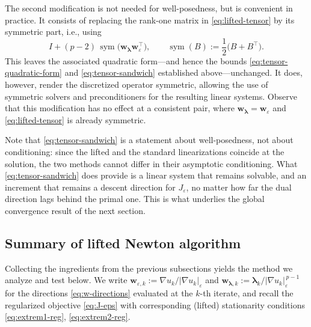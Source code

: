 \documentclass[11pt,pdflatex,sn-mathphys-num]{sn-jnl}
\theoremstyle{thmstyleone}%
\theoremstyle{thmstyletwo}%
\theoremstyle{thmstylethree}%
\newcommand{\bs}[1]{\ensuremath{\boldsymbol{#1}}}
\DeclareMathOperator{\sym}{sym}
\begin{document}
The second modification is not needed for well-posedness, but is convenient in practice. It consists of
replacing the rank-one matrix in \eqref{eq:lifted-tensor} by its symmetric part, i.e., using
\begin{equation}\label{eq:lifted-tensor-sym}
  I + (p-2)\,\sym\bigl(\bs w_{\bs\lambda}\bs w_\varepsilon^\top\bigr),
  \qquad \sym(B):=\frac12\bigl(B+B^\top\bigr).
\end{equation}
This leaves the associated quadratic form---and hence the bounds \eqref{eq:tensor-quadratic-form} and \eqref{eq:tensor-sandwich} established above---unchanged. It does, however, render the discretized operator symmetric, allowing the use of symmetric solvers and preconditioners for the resulting linear systems. Observe that this modification has no effect at a consistent pair, where $\bs w_{\bs\lambda}=\bs w_\varepsilon$ and \eqref{eq:lifted-tensor} is already symmetric.

Note that \eqref{eq:tensor-sandwich} is a statement about well-posedness, not about conditioning: since the lifted and the standard linearizations coincide at the solution, the two methods cannot differ in their asymptotic conditioning. What \eqref{eq:tensor-sandwich} does provide is a linear system that remains solvable, and an increment that remains a descent direction for $J_\varepsilon$, no matter how far the dual direction lags behind the primal one. This is what underlies the global convergence result of the next section.


\subsection{Summary of lifted Newton algorithm}
\label{ssec:lifted-algorithm}
Collecting the ingredients from the previous subsections yields the method we analyze and test below. We write
$\bs w_{\varepsilon,k}:=\nabla u_k/|\nabla u_k|_\varepsilon$ and
$\bs w_{\bs\lambda,k}:=\bs\lambda_k/|\nabla u_k|_\varepsilon^{\,p-1}$
for the directions \eqref{eq:w-directions} evaluated at the $k$-th iterate, and recall the regularized objective \eqref{eq:J-eps} with corresponding (lifted) stationarity conditions \eqref{eq:extrem1-reg}, \eqref{eq:extrem2-reg}.
\end{document}
